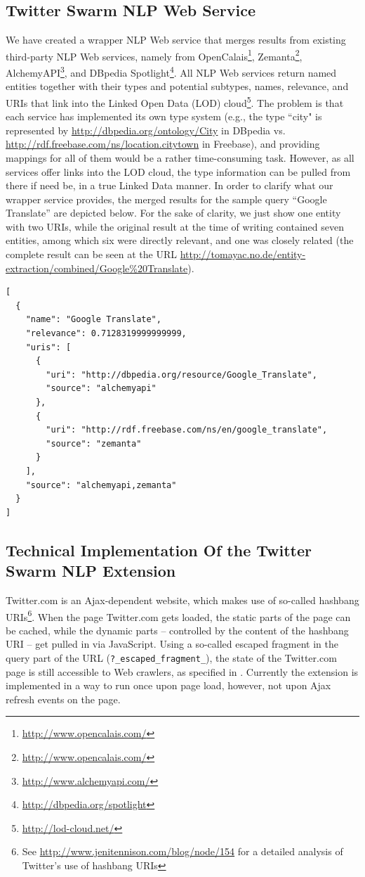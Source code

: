 \documentclass[runningheads,a4paper]{llncs}
\begin{document}
\subsection{Twitter Swarm NLP Web Service}\label{sec:webservice}
We have created a wrapper NLP Web service that merges results from existing third-party NLP Web services, namely from OpenCalais\footnote{\url{http://www.opencalais.com/}}, Zemanta\footnote{\url{http://www.opencalais.com/}}, AlchemyAPI\footnote{\url{http://www.alchemyapi.com/}}, and DBpedia Spotlight\footnote{\url{http://dbpedia.org/spotlight}}. All NLP Web services return named entities together with their types and potential subtypes, names, relevance, and URIs that link into the Linked Open Data (LOD) cloud\footnote{\url{http://lod-cloud.net/}}. The problem is that each service has implemented its own type system (e.g., the type ``city" is represented by \url{http://dbpedia.org/ontology/City} in DBpedia vs. \url{http://rdf.freebase.com/ns/location.citytown} in Freebase), and providing mappings for all of them would be a rather time-consuming task. However, as all services offer links into the LOD cloud, the type information can be pulled from there if need be, in a true Linked Data manner. In order to clarify what our wrapper service provides, the merged results for the sample query ``Google Translate'' are depicted below. For the sake of clarity, we just show one entity with two URIs, while the original result at the time of writing contained seven entities, among which six were directly relevant, and one was closely related (the complete result can be seen at the URL \url{http://tomayac.no.de/entity-extraction/combined/Google%20Translate}).

\begin{lstlisting}
[
  {
    "name": "Google Translate",
    "relevance": 0.7128319999999999,
    "uris": [
      {
        "uri": "http://dbpedia.org/resource/Google_Translate",
        "source": "alchemyapi"
      },
      {
        "uri": "http://rdf.freebase.com/ns/en/google_translate",
        "source": "zemanta"
      }
    ],
    "source": "alchemyapi,zemanta"
  }
]
\end{lstlisting}

\subsection{Technical Implementation Of the Twitter Swarm NLP Extension}\label{sec:techimp}
Twitter.com is an Ajax-dependent website, which makes use of so-called hashbang URIs\footnote{See \url{http://www.jenitennison.com/blog/node/154} for a detailed analysis of Twitter's use of hashbang URIs}. When the page Twitter.com gets loaded, the static parts of the page can be cached, while the dynamic parts -- controlled by the content of the hashbang URI -- get pulled in via JavaScript. Using a so-called escaped fragment in the query part of the URL (\texttt{?\_escaped\_fragment\_}), the state of the Twitter.com page is still accessible to Web crawlers, as specified in \cite{Google:Ajax}. Currently the extension is implemented in a way to run once upon page load, however, not upon Ajax refresh events on the page.
\end{document}
